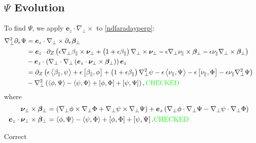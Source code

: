 \documentclass{article}
\newcommand{\para}{\parallel}
\newcommand{\ep}{\epsilon}
\newcommand{\np}{\nabla_\perp}
\newcommand{\p}{\partial}
\newcommand{\pth} [1] {\left( #1 \right) }
\newcommand{\br} [1] {\left[ #1 \right] }
\begin{document}
\subsection{$\Psi$ Evolution}
To find $\Psi$, we apply $\bm{e}_z\cdot\np\times$ to \eqref{ndfaradayperp}: 
\begin{align} \label{Psievolution} 
    \np^2\p_\tau\Psi &= \bm{e}_z\cdot\np \times \p_\tau\bm{\beta}_\perp \nonumber\\ 
        &= \bm{e}_z\cdot \p_Z\pth{\ep\np\beta_\para\times\bm{\nu}_\perp + \pth{1+\ep\beta_\para}\np\times\bm{\nu}_\perp - \ep\np\nu_\para\times\bm{\beta}_\perp - \ep\nu_\para\np\times\bm{\beta}_\perp} \nonumber\\ 
        &- \bm{e}_z\cdot \pth{\np\cdot\np \pth{\bm{e}_z\cdot\bm{\nu}_\perp\times\bm{\beta}_\perp}} \bm{e}_z \nonumber\\ 
    &= \p_Z\pth{\ep\Braket{\beta_\para, \psi} + \ep\br{\beta_\para, \phi} + \pth{1+\ep\beta_\para}\np^2\psi - \ep\Braket{\nu_\para, \Psi} - \ep\br{\nu_\para, \Phi} - \ep\nu_\para\np^2\Psi} \nonumber\\ 
    &- \np^2\pth{\Braket{\phi, \Psi} - \Braket{\psi, \Phi} + \br{\phi, \Phi} + \br{\psi, \Psi}}, \text{\color{green}CHECKED} 
\end{align}
where 
\begin{align*}
    \bm{\nu}_\perp \times \bm{\beta}_\perp &= \pth{\np\phi \times \np\Phi + \np\psi\times\np\Psi} + \bm{e}_z \pth{\np\phi \cdot \np\Psi - \np\psi \cdot \np\Phi} \\ 
    \bm{e}_z \cdot \bm{\nu}_\perp \times \bm{\beta}_\perp &= \Braket{\phi, \Psi} - \Braket{\psi, \Phi} + \br{\phi, \Phi} + \br{\psi, \Psi}. \text{\color{green}CHECKED} 
\end{align*} 

{\color{blue} Correct}
\end{document}
